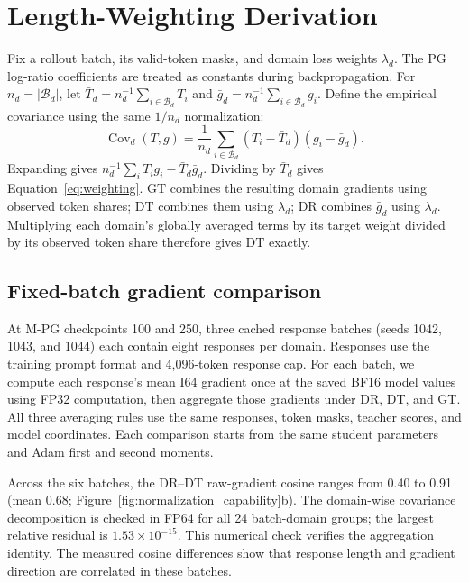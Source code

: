 \section{Length-Weighting Derivation}
\label{app:normalization}

Fix a rollout batch, its valid-token masks, and domain loss weights $\lambda_d$. The PG log-ratio coefficients are treated as constants during backpropagation. For $n_d=|\mathcal B_d|$, let $\bar T_d=n_d^{-1}\sum_{i\in\mathcal B_d}T_i$ and $\bar g_d=n_d^{-1}\sum_{i\in\mathcal B_d}g_i$. Define the empirical covariance using the same $1/n_d$ normalization:
\begin{equation}
\operatorname{Cov}_d(T,g)=\frac{1}{n_d}\sum_{i\in\mathcal B_d}(T_i-\bar T_d)(g_i-\bar g_d).
\end{equation}
Expanding gives $n_d^{-1}\sum_iT_i g_i-\bar T_d\bar g_d$. Dividing by $\bar T_d$ gives Equation~\ref{eq:weighting}. GT combines the resulting domain gradients using observed token shares; DT combines them using $\lambda_d$; DR combines $\bar g_d$ using $\lambda_d$. Multiplying each domain's globally averaged terms by its target weight divided by its observed token share therefore gives DT exactly.

\subsection{Fixed-batch gradient comparison}
\label{app:fixed_batch_normalization}

At M-PG checkpoints 100 and 250, three cached response batches (seeds 1042, 1043, and 1044) each contain eight responses per domain. Responses use the training prompt format and 4,096-token response cap. For each batch, we compute each response's mean I64 gradient once at the saved BF16 model values using FP32 computation, then aggregate those gradients under DR, DT, and GT. All three averaging rules use the same responses, token masks, teacher scores, and model coordinates. Each comparison starts from the same student parameters and Adam first and second moments.

Across the six batches, the DR--DT raw-gradient cosine ranges from 0.40 to 0.91 (mean 0.68; Figure~\ref{fig:normalization_capability}b). The domain-wise covariance decomposition is checked in FP64 for all 24 batch-domain groups; the largest relative residual is $1.53\times10^{-15}$. This numerical check verifies the aggregation identity. The measured cosine differences show that response length and gradient direction are correlated in these batches.

